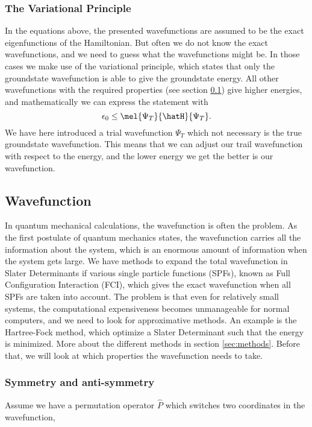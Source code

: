 \subsubsection{The Variational Principle}
In the equations above, the presented wavefunctions are assumed to be the exact eigenfunctions of the Hamiltonian. But often we do not know the exact wavefunctions, and we need to guess what the wavefunctions might be. In those cases we make use of the variational principle, which states that only the groundstate wavefunction is able to give the groundstate energy. All other wavefunctions with the required properties (see section \ref{subsec:wavefunction}) give higher energies, and mathematically we can express the statement with
\begin{equation}
\epsilon_0\leq\mel{\Psi_T}{\hatH}{\Psi_T}.
\end{equation}
We have here introduced a trial wavefunction $\Psi_T$ which not necessary is the true groundstate wavefunction. This means that we can adjust our trail wavefunction with respect to the energy, and the lower energy we get the better is our wavefunction. 

\subsection{Wavefunction} \label{subsec:wavefunction}
In quantum mechanical calculations, the wavefunction is often the problem. As the first postulate of quantum mechanics states, the wavefunction carries all the information about the system, which is an enormous amount of information when the system gets large. We have methods to expand the total wavefunction in Slater Determinants if various single particle functions (SPFs), known as Full Configuration Interaction (FCI), which gives the exact wavefunction when all SPFs are taken into account. The problem is that even for relatively small systems, the computational expensiveness becomes unmanageable for normal computers, and we need to look for approximative methods. An example is the Hartree-Fock method, which optimize a Slater Determinant such that the energy is minimized. More about the different methods in section \ref{sec:methods}. Before that, we will look at which properties the wavefunction needs to take.

\subsubsection{Symmetry and anti-symmetry} \label{subsubsec:symmetry}
Assume we have a permutation operator $\hat{P}$ which switches two coordinates in the wavefunction,


